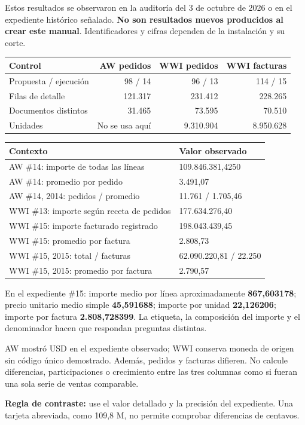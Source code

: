 Estos resultados se observaron en la auditoría del 3 de octubre de 2026 o en el expediente histórico señalado. \textbf{No son resultados nuevos producidos al crear este manual}. Identificadores y cifras dependen de la instalación y su corte.
\begin{tabularx}{\linewidth}{@{}Yrrr@{}}
\toprule
\textbf{Control}&\textbf{AW pedidos}&\textbf{WWI pedidos}&\textbf{WWI facturas}\\
\midrule
Propuesta / ejecución&98 / 14&96 / 13&114 / 15\\
Filas de detalle&121.317&231.412&228.265\\
Documentos distintos&31.465&73.595&70.510\\
Unidades&No se usa aquí&9.310.904&8.950.628\\
\bottomrule
\end{tabularx}
\begin{tabularx}{\linewidth}{@{}Yp{53mm}@{}}
\toprule
\textbf{Contexto}&\textbf{Valor observado}\\
\midrule
AW \#14: importe de todas las líneas&109.846.381,4250\\
AW \#14: promedio por pedido&3.491,07\\
AW \#14, 2014: pedidos / promedio&11.761 / 1.705,46\\
WWI \#13: importe según receta de pedidos&177.634.276,40\\
WWI \#15: importe facturado registrado&198.043.439,45\\
WWI \#15: promedio por factura&2.808,73\\
WWI \#15, 2015: total / facturas&62.090.220,81 / 22.250\\
WWI \#15, 2015: promedio por factura&2.790,57\\
\bottomrule
\end{tabularx}
En el expediente \#15: importe medio por línea aproximadamente \textbf{867,603178}; precio unitario medio simple \textbf{45,591688}; importe por unidad \textbf{22,126206}; importe por factura \textbf{2.808,728399}. La etiqueta, la composición del importe y el denominador hacen que respondan preguntas distintas.
\begin{note}
AW mostró USD en el expediente observado; WWI conserva moneda de origen sin código único demostrado. Además, pedidos y facturas difieren. No calcule diferencias, participaciones o crecimiento entre las tres columnas como si fueran una sola serie de ventas comparable.
\end{note}
\textbf{Regla de contraste:} use el valor detallado y la precisión del expediente. Una tarjeta abreviada, como 109,8 M, no permite comprobar diferencias de centavos.

